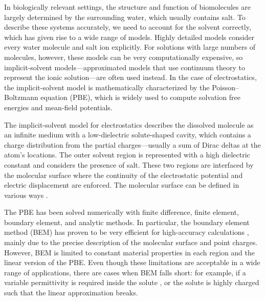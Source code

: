 In biologically relevant settings, the structure and function of biomolecules are largely determined by the surrounding water, which usually contains salt. 
To describe these systems accurately, we need to account for the solvent correctly, which has given rise to a wide range of models.\cite{onufriev2018water}
Highly detailed models consider every water molecule and salt ion explicitly.
For solutions with large numbers of molecules, however, these models can be very computationally expensive, so implicit-solvent models---approximated models that use continuum theory to represent the ionic solution---are often used instead.\cite{RouxSimonson1999,DecherchiETal2015}
In the case of electrostatics, the implicit-solvent model is mathematically characterized by the Poisson--Boltzmann equation (PBE)\cite{Baker2004,Bardhan2012}, which is widely used to compute solvation free energies and mean-field potentials.

The implicit-solvent model for electrostatics describes the dissolved molecule as an infinite medium with a low-dielectric solute-shaped cavity, which contains a charge distribution from the partial charges---usually a sum of Dirac deltas at the atom's locations.
The outer solvent region is represented with a high dielectric constant and considers the presence of salt.
These two regions are interfaced by the molecular surface where the continuity of the electrostatic potential and electric displacement are enforced.
The molecular surface can be defined in various ways \cite{HarrisBoschitcshFenley2013}.


The PBE has been solved numerically with finite difference\cite{BakerETal2001,GilsonETal1985,JurrusETal2018,LiETal2019}, finite element\cite{HolstETal2012,BondEtal2010,nakov2021argos}, boundary element\cite{boschitsch2002fast,LuETal2006,AltmanBardhanWhiteTidor09,bajaj2011efficient,GengKrasny2013,CooperBardhanBarba2014}, and analytic\cite{YapHeadgordon2010,FelbergETal2017,quan2019domain,siryk2022arbitrary,jha2023domain} methods.
In particular, the boundary element method (BEM) has proven to be very efficient for high-accuracy calculations \cite{GengKrasny2013,CooperBardhanBarba2014}, mainly due to the precise description of the molecular surface and point charges. 
However, BEM is limited to constant material properties in each region and the linear version of the PBE. 
Even though these limitations are acceptable in a wide range of applications, there are cases when BEM falls short: for example, if a variable permittivity is required inside the solute \cite{grant2001smooth,li2013dielectric}, or the solute is highly charged such that the linear approximation breaks\cite{FogolariETal1999}.

